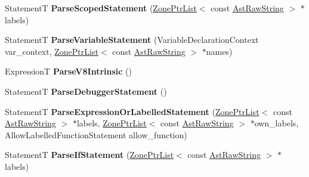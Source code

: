 \begin{DoxyCompactItemize}
\item 
\mbox{\label{classv8_1_1internal_1_1ParserBase_a436a16975192dd12523344f728578a17}} 
StatementT {\bfseries Parse\+Scoped\+Statement} (\mbox{\hyperlink{classv8_1_1internal_1_1ZoneList}{Zone\+Ptr\+List}}$<$ const \mbox{\hyperlink{classv8_1_1internal_1_1AstRawString}{Ast\+Raw\+String}} $>$ $\ast$labels)
\item 
\mbox{\label{classv8_1_1internal_1_1ParserBase_aaca3b4ba8d6775217e02d14f780db8d2}} 
StatementT {\bfseries Parse\+Variable\+Statement} (Variable\+Declaration\+Context var\+\_\+context, \mbox{\hyperlink{classv8_1_1internal_1_1ZoneList}{Zone\+Ptr\+List}}$<$ const \mbox{\hyperlink{classv8_1_1internal_1_1AstRawString}{Ast\+Raw\+String}} $>$ $\ast$names)
\item 
\mbox{\label{classv8_1_1internal_1_1ParserBase_a4fdb10261042841fabe96286de1905d7}} 
ExpressionT {\bfseries Parse\+V8\+Intrinsic} ()
\item 
\mbox{\label{classv8_1_1internal_1_1ParserBase_a0e6cabf7de0dfbf96899963372951eb1}} 
StatementT {\bfseries Parse\+Debugger\+Statement} ()
\item 
\mbox{\label{classv8_1_1internal_1_1ParserBase_af7c4e7838aed3fbef3f2dfa0fd833d9e}} 
StatementT {\bfseries Parse\+Expression\+Or\+Labelled\+Statement} (\mbox{\hyperlink{classv8_1_1internal_1_1ZoneList}{Zone\+Ptr\+List}}$<$ const \mbox{\hyperlink{classv8_1_1internal_1_1AstRawString}{Ast\+Raw\+String}} $>$ $\ast$labels, \mbox{\hyperlink{classv8_1_1internal_1_1ZoneList}{Zone\+Ptr\+List}}$<$ const \mbox{\hyperlink{classv8_1_1internal_1_1AstRawString}{Ast\+Raw\+String}} $>$ $\ast$own\+\_\+labels, Allow\+Labelled\+Function\+Statement allow\+\_\+function)
\item 
\mbox{\label{classv8_1_1internal_1_1ParserBase_ad12f199ac8464bd6b5e11955a41dd0fb}} 
StatementT {\bfseries Parse\+If\+Statement} (\mbox{\hyperlink{classv8_1_1internal_1_1ZoneList}{Zone\+Ptr\+List}}$<$ const \mbox{\hyperlink{classv8_1_1internal_1_1AstRawString}{Ast\+Raw\+String}} $>$ $\ast$labels)
\item 
\mbox{\label{classv8_1_1internal_1_1ParserBase_a67ea1d26b7a18926695e48c0fc282180}} 

\end{DoxyCompactItemize}
